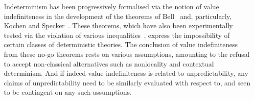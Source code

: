 \documentclass[%
 superscriptaddress,
 preprint,
 showpacs,
 showkeys,
 preprintnumbers,
  amsmath,amssymb,
  aps,
 pra,
  longbibliography,
  floatfix,
 ]{revtex4-1}
\theoremstyle{definition}
\begin{document}
Indeterminism has been progressively formalised via the notion of value indefiniteness in the development of the theorems of Bell~\cite{bell-66} and, particularly,  Kochen and Specker~\cite{kochen1}.
These theorems, which have also been experimentally tested via the violation of various inequalities~\cite{wjswz-98}, express the impossibility of certain classes of deterministic theories.
The conclusion of value indefiniteness from these no-go theorems rests on various assumptions, amounting to the refusal to accept non-classical alternatives such as nonlocality and contextual determinism.
{\color{green} And if indeed value indefiniteness is related to unpredictability,} any claims of unpredictability need to be similarly evaluated with respect to, and seen to be contingent on any such assumptions.


\end{document}
